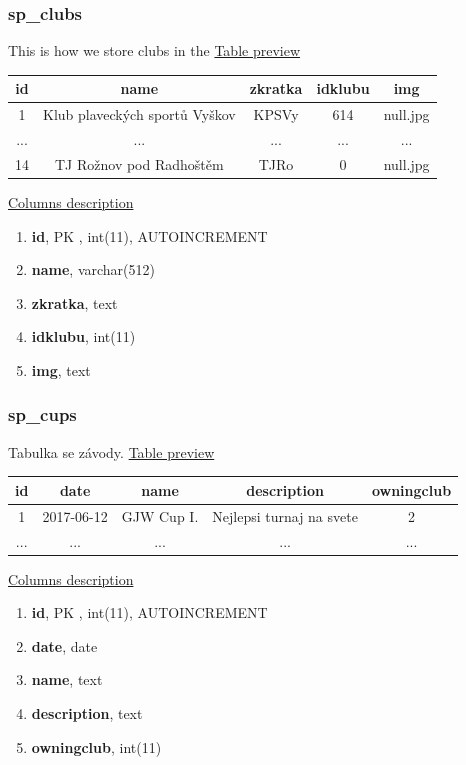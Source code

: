 \subsubsection*{sp\_clubs}
This is how we store clubs in the 
\newline
\underline{Table preview}
\begin{center}
 \begin{tabular}{||c c c c c||} 
 \hline
 id & name & zkratka & idklubu & img \\ [0.5ex] 
 \hline\hline
 1 & Klub plaveckých sportů Vyškov & KPSVy & 614 & null.jpg \\ 
 \hline
 ... & ... & ... & ... & ... \\ 
\hline
 14 & TJ Rožnov pod Radhoštěm & TJRo & 0 & null.jpg \\ [1ex] 
 \hline
\end{tabular}
\end{center}
\underline{Columns description}
\begin{enumerate}
  \setlength\itemsep{0em}
  \item \textbf{id}, PK , int(11), AUTOINCREMENT
  \item \textbf{name}, varchar(512)
  \item \textbf{zkratka}, text
  \item \textbf{idklubu}, int(11)
  \item \textbf{img}, text
\end{enumerate}

\subsubsection*{sp\_cups}
Tabulka se závody.
\newline
\underline{Table preview}
\begin{center}
 \begin{tabular}{||c c c c c||} 
 \hline
 id & date & name & description & owningclub  \\ [0.5ex] 
 \hline\hline
 1 & 2017-06-12 & GJW Cup I. & Nejlepsi turnaj na svete & 2 \\ 
 \hline
 ... & ... & ... & ... & ...  \\ [1ex] 
 \hline
\end{tabular}
\end{center}
\underline{Columns description}
\begin{enumerate}
  \setlength\itemsep{0em}
  \item \textbf{id}, PK , int(11), AUTOINCREMENT
  \item \textbf{date}, date
  \item \textbf{name}, text
  \item \textbf{description}, text
  \item \textbf{owningclub}, int(11)
\end{enumerate}


